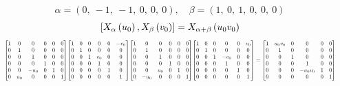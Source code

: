 \documentclass[11pt]{article}
\theoremstyle{definition}
\begin{document}
\[
\alpha = \left( 0, \  -1, \  -1, \  0, \  0, \  0\right), \quad \beta = \left( 1, \  0, \  1, \  0, \  0, \  0\right)
\]
\[
\scaletoalign{\textwidth}{\left[ X_{\alpha}\left(u_{0}\right), X_{\beta}\left(v_{0}\right) \right] = X_{\alpha + \beta}\left(u_{0} v_{0}\right)}
\]
\[
\scaletoalign{\textwidth}{{\left[\begin{matrix}1 & 0 & 0 & 0 & 0 & 0\\0 & 1 & 0 & 0 & 0 & 0\\0 & 0 & 1 & 0 & 0 & 0\\0 & 0 & 0 & 1 & 0 & 0\\0 & 0 & - u_{0} & 0 & 1 & 0\\0 & u_{0} & 0 & 0 & 0 & 1\end{matrix}\right]} {\left[\begin{matrix}1 & 0 & 0 & 0 & 0 & - v_{0}\\0 & 1 & 0 & 0 & 0 & 0\\0 & 0 & 1 & v_{0} & 0 & 0\\0 & 0 & 0 & 1 & 0 & 0\\0 & 0 & 0 & 0 & 1 & 0\\0 & 0 & 0 & 0 & 0 & 1\end{matrix}\right]} {\left[\begin{matrix}1 & 0 & 0 & 0 & 0 & 0\\0 & 1 & 0 & 0 & 0 & 0\\0 & 0 & 1 & 0 & 0 & 0\\0 & 0 & 0 & 1 & 0 & 0\\0 & 0 & u_{0} & 0 & 1 & 0\\0 & - u_{0} & 0 & 0 & 0 & 1\end{matrix}\right]} {\left[\begin{matrix}1 & 0 & 0 & 0 & 0 & v_{0}\\0 & 1 & 0 & 0 & 0 & 0\\0 & 0 & 1 & - v_{0} & 0 & 0\\0 & 0 & 0 & 1 & 0 & 0\\0 & 0 & 0 & 0 & 1 & 0\\0 & 0 & 0 & 0 & 0 & 1\end{matrix}\right]} = {\left[\begin{matrix}1 & u_{0} v_{0} & 0 & 0 & 0 & 0\\0 & 1 & 0 & 0 & 0 & 0\\0 & 0 & 1 & 0 & 0 & 0\\0 & 0 & 0 & 1 & 0 & 0\\0 & 0 & 0 & - u_{0} v_{0} & 1 & 0\\0 & 0 & 0 & 0 & 0 & 1\end{matrix}\right]}}
\]
\end{document}
